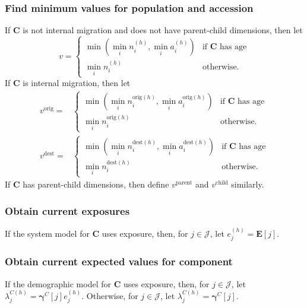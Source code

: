 \documentclass{article}
\begin{document}
\subsubsection{Find minimum values for population and accession}

If $\bm{C}$ is not internal migration and does not have parent-child dimensions, then let
\begin{equation}
    v =
      \begin{cases}
          \min \left( \min_i n_i^{(h)}, \min_i a_i^{(h)} \right) & \text{if } \bm{C} \text{ has age} \\
        \min_i n_i^{(h)} & \text{otherwise}.
      \end{cases}
\end{equation}
If $\bm{C}$ is internal migration, then let
\begin{align}
   v^{\text{orig}} = &
    \begin{cases}
       \min \left( \min_i n_i^{\text{orig}(h)},\min_i a_i^{\text{orig}(h)} \right)  & \text{if } \bm{C} \text{ has age} \\
       \min_i n_i^{\text{orig}(h)} & \text{otherwise}. 
    \end{cases} \\
   v^{\text{dest}} = &
    \begin{cases}
       \min \left( \min_i n_i^{\text{dest}(h)},\min_i a_i^{\text{dest}(h)} \right)  & \text{if } \bm{C} \text{ has age} \\
       \min_i n_i^{\text{dest}(h)} & \text{otherwise}.
     \end{cases}
   \end{align}
If $\bm{C}$ has parent-child dimensions, then define $v^{\text{parent}}$ and $v^{\text{child}}$ similarly.


\subsubsection{Obtain current exposures}

If the system model for $\bm{C}$ uses exposure, then, for $j \in \mathcal{J}$, let $e_j^{(h)} = \bm{E}[j]$.


\subsubsection{Obtain current expected values for component}

If the demographic model for $\bm{C}$ uses exposure, then, for $j \in \mathcal{J}$, let $\lambda_j^{C (h)} = \bm{\gamma}^C[j] e_j^{(h)}$.  Otherwise, for $j \in \mathcal{J}$, let $\lambda_j^{C (h)} = \bm{\gamma}^C[j]$.  
\end{document}
